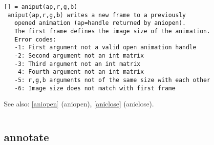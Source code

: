 \documentclass[a4paper]{article}
\begin{document}
\begin{tscreen}
\begin{verbatim}
[] = aniput(ap,r,g,b)
 aniput(ap,r,g,b) writes a new frame to a previously
   opened animation (ap=handle returned by aniopen).
   The first frame defines the image size of the animation.
   Error codes:
   -1: First argument not a valid open animation handle
   -2: Second argument not an int matrix
   -3: Third argument not an int matrix
   -4: Fourth argument not an int matrix
   -5: r,g,b arguments not of the same size with each other
   -6: Image size does not match with first frame
\end{verbatim}

See also: \ref{aniopen} {(aniopen)}, \ref{aniclose} {(aniclose)}.
\begin{verbatim}
\end{verbatim}
\end{tscreen}





\subsection{annotate\label{annotate}}
\end{document}

